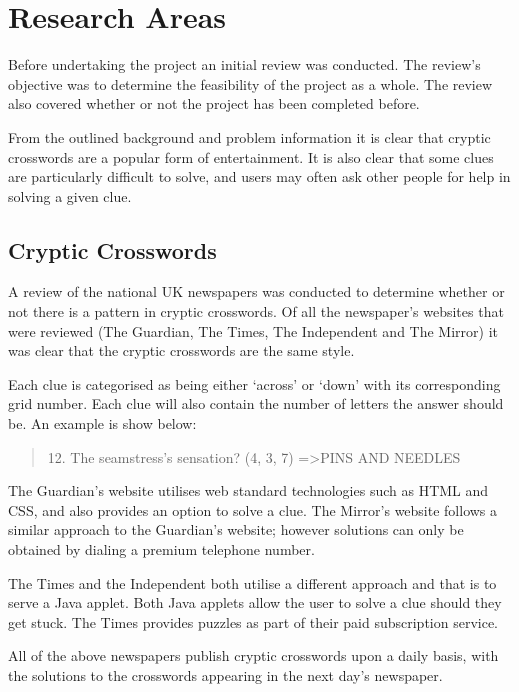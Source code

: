 \section{Research Areas}

Before undertaking the project an initial review was conducted. The review's 
objective was to determine the feasibility of the project as a whole. The 
review also covered whether or not the project has been completed before.

From the outlined background and problem information it is clear that cryptic 
crosswords are a popular form of entertainment. It is also clear that some 
clues are particularly difficult to solve, and users may often ask other people
for help in solving a given clue.


\subsection{Cryptic Crosswords}

A review of the national UK newspapers was conducted to determine whether or 
not there is a pattern in cryptic crosswords. Of all the newspaper's websites 
that were reviewed (The Guardian, The Times, The Independent and The Mirror) it 
was clear that the cryptic crosswords are the same style.

Each clue is categorised as being either `across' or `down' with its 
corresponding grid number. Each clue will also contain the number of letters 
the answer should be. An example is show below:

\begin{quote}
12. The seamstress's sensation? (4, 3, 7) =\textgreater  PINS AND NEEDLES
\end{quote}

The Guardian's website utilises web standard technologies such as HTML and CSS, 
and also provides an option to solve a clue. The Mirror's website follows a 
similar approach to the Guardian's website; however solutions can only be 
obtained by dialing a premium telephone number.

The Times and the Independent both utilise a different approach and that is to 
serve a Java applet. Both Java applets allow the user to solve a clue should 
they get stuck. The Times provides puzzles as part of their paid subscription 
service.

All of the above newspapers publish cryptic crosswords upon a daily basis, with
the solutions to the crosswords appearing in the next day's newspaper.

